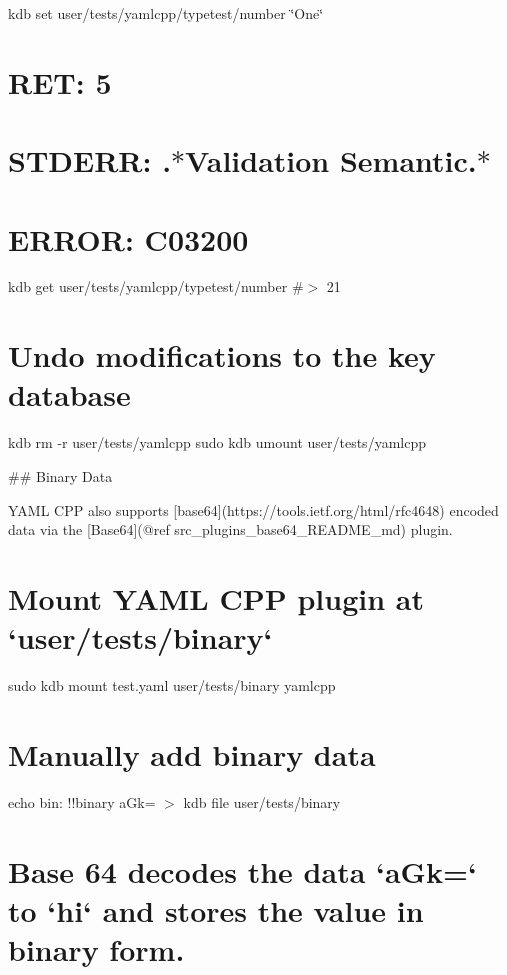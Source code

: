 kdb set user/tests/yamlcpp/typetest/number \char`\"{}\+One\char`\"{} \hypertarget{autotoc_md865_autotoc_md914}{}\section{R\+E\+T\+: 5}\label{autotoc_md865_autotoc_md914}
\hypertarget{autotoc_md865_autotoc_md915}{}\section{S\+T\+D\+E\+R\+R\+: .$\ast$\+Validation Semantic.$\ast$}\label{autotoc_md865_autotoc_md915}
\hypertarget{autotoc_md865_autotoc_md916}{}\section{E\+R\+R\+O\+R\+: C03200}\label{autotoc_md865_autotoc_md916}
kdb get user/tests/yamlcpp/typetest/number \#$>$ 21\hypertarget{autotoc_md865_autotoc_md917}{}\section{Undo modifications to the key database}\label{autotoc_md865_autotoc_md917}
kdb rm -\/r user/tests/yamlcpp sudo kdb umount user/tests/yamlcpp 
\begin{DoxyCode}
## Binary Data

YAML CPP also supports [base64](https://tools.ietf.org/html/rfc4648) encoded data via the [Base64](@ref
       src\_plugins\_base64\_README\_md) plugin.
\end{DoxyCode}
 \hypertarget{autotoc_md865_autotoc_md918}{}\section{Mount Y\+A\+M\+L C\+P\+P plugin at `user/tests/binary`}\label{autotoc_md865_autotoc_md918}
sudo kdb mount test.\+yaml user/tests/binary yamlcpp \hypertarget{autotoc_md865_autotoc_md919}{}\section{Manually add binary data}\label{autotoc_md865_autotoc_md919}
echo \textquotesingle{}bin\+: !!binary a\+Gk=\textquotesingle{} $>$ {\ttfamily kdb file user/tests/binary}\hypertarget{autotoc_md865_autotoc_md920}{}\section{Base 64 decodes the data `a\+Gk=` to `hi` and stores the value in binary form.}\label{autotoc_md865_autotoc_md920}
